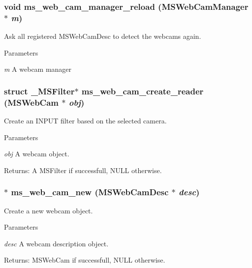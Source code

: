 \subsubsection[{ms\_\-web\_\-cam\_\-manager\_\-reload}]{\setlength{\rightskip}{0pt plus 5cm}void ms\_\-web\_\-cam\_\-manager\_\-reload ({\bf MSWebCamManager} $\ast$ {\em m})}\label{group__mediastreamer2__webcam_gae179d044696ffc04bb6873f03e84b4ca}
Ask all registered MSWebCamDesc to detect the webcams again.


\begin{DoxyParams}{Parameters}
\item[{\em m}]A webcam manager \end{DoxyParams}
\subsubsection[{ms\_\-web\_\-cam\_\-create\_\-reader}]{\setlength{\rightskip}{0pt plus 5cm}struct \_\-MSFilter$\ast$ ms\_\-web\_\-cam\_\-create\_\-reader ({\bf MSWebCam} $\ast$ {\em obj})\hspace{0.3cm}{\ttfamily  [read]}}\label{group__mediastreamer2__webcam_ga9f56789f84a638e162db7681141116c3}
Create an INPUT filter based on the selected camera.


\begin{DoxyParams}{Parameters}
\item[{\em obj}]A webcam object.\end{DoxyParams}
Returns: A MSFilter if successfull, NULL otherwise. 
\subsubsection[{ms\_\-web\_\-cam\_\-new}]{$\ast$ ms\_\-web\_\-cam\_\-new ({\bf MSWebCamDesc} $\ast$ {\em desc})}\label{group__mediastreamer2__webcam_ga724d3f85cf299d9424b45b54b49c11db}
Create a new webcam object.


\begin{DoxyParams}{Parameters}
\item[{\em desc}]A webcam description object.\end{DoxyParams}
Returns: MSWebCam if successfull, NULL otherwise. 
